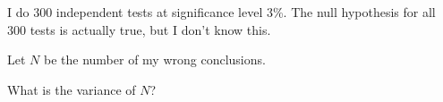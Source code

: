 
\begin{question}
I do \(300\) independent tests at significance level 3\%.
The null hypothesis for all \(300\)
tests is actually true, but I don't know this.

Let \(N\) be the number of my wrong conclusions.

What is the variance of \(N\)?
\end{question}


